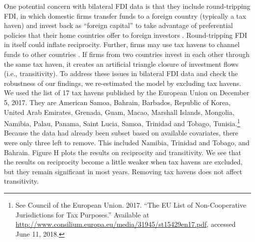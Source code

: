 \documentclass[reqno,onecolumn,letterpaper,12pt]{article}
\begin{document}
{One potential concern with bilateral FDI data is that they include round-tripping FDI, in which domestic firms transfer funds to a foreign country (typically a tax haven) and invest back as ``foreign capital'' to take advantage of preferential policies that their home countries offer to foreign investors \citep{Borga:2016}. Round-tripping FDI in itself could inflate reciprocity. Further, firms may use tax havens to channel funds to other countries \citep{Borga:2017}. If firms from two countries invest in each other through the same tax haven, it creates an artificial triangle closure of investment flows (i.e., transitivity). To address these issues in bilateral FDI data and check the robustness of our findings, we re-estimated the model by excluding tax havens. We used the list of 17 tax havens published by the European Union on December 5, 2017. They are American Samoa, Bahrain, Barbados, Republic of Korea, United Arab Emirates, Grenada, Guam, Macao, Marshall Islands, Mongolia, Namibia, Palau, Panama, Saint Lucia, Samoa, Trinidad and Tobago, Tunisia.\footnote{See Council of the European Union. 2017. ``The EU List of Non-Cooperative Jurisdictions for Tax Purposes.'' Available at \url{http://www.consilium.europa.eu/media/31945/st15429en17.pdf}, accessed June 11, 2018.}
Because the data had already been subset based on available covariates, there were only three left to remove. This included  Namibia,  Trinidad and Tobago, and Bahrain. Figure H plots the results on reciprocity and transitivity. We see that the results on reciprocity become a little weaker when tax havens are excluded, but they remain significant in most years. Removing tax havens does not affect transitivity.

}
\end{document}
